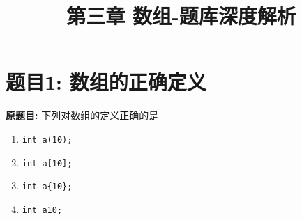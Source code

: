 \documentclass[a4paper,12pt]{article}
\title{\textbf{第三章 数组-题库深度解析}}
\author{}
\date{}
\begin{document}
\maketitle

\tableofcontents
\newpage

\section*{题目1: 数组的正确定义}

\textbf{原题目:}
下列对数组的定义正确的是
\begin{enumerate}
	\item[A)] \texttt{int a(10);}
	\item[B)] \texttt{int a[10];}
	\item[C)] \texttt{int a\{10\};}
	\item[D)] \texttt{int a10;}
\end{enumerate}
\end{document}
